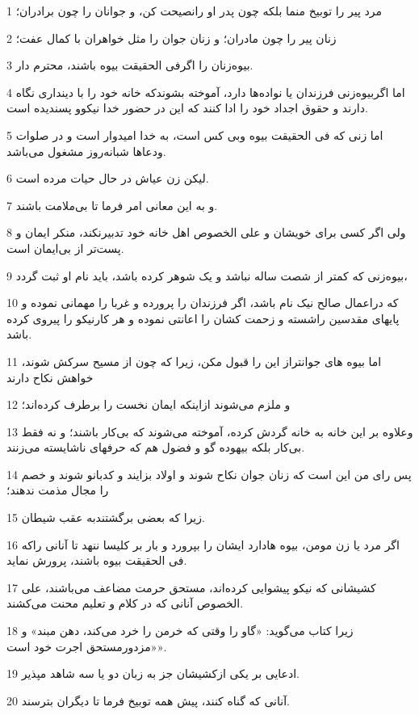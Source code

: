 \par 1 مرد پیر را توبیخ منما بلکه چون پدر او رانصیحت کن، و جوانان را چون برادران؛
\par 2 زنان پیر را چون مادران؛ و زنان جوان را مثل خواهران با کمال عفت؛
\par 3 بیوه‌زنان را اگرفی الحقیقت بیوه باشند، محترم دار.
\par 4 اما اگربیوه‌زنی فرزندان یا نواده‌ها دارد، آموخته بشوندکه خانه خود را با دینداری نگاه دارند و حقوق اجداد خود را ادا کنند که این در حضور خدا نیکوو پسندیده است.
\par 5 اما زنی که فی الحقیقت بیوه وبی کس است، به خدا امیدوار است و در صلوات ودعاها شبانه‌روز مشغول می‌باشد.
\par 6 لیکن زن عیاش در حال حیات مرده است.
\par 7 و به این معانی امر فرما تا بی‌ملامت باشند.
\par 8 ولی اگر کسی برای خویشان و علی الخصوص اهل خانه خود تدبیرنکند، منکر ایمان و پست‌تر از بی‌ایمان است.
\par 9 بیوه‌زنی که کمتر از شصت ساله نباشد و یک شوهر کرده باشد، باید نام او ثبت گردد،
\par 10 که دراعمال صالح نیک نام باشد، اگر فرزندان را پرورده و غربا را مهمانی نموده و پایهای مقدسین راشسته و زحمت کشان را اعانتی نموده و هر کارنیکو را پیروی کرده باشد.
\par 11 اما بیوه های جوانتراز این را قبول مکن، زیرا که چون از مسیح سرکش شوند، خواهش نکاح دارند
\par 12 و ملزم می‌شوند ازاینکه ایمان نخست را برطرف کرده‌اند؛
\par 13 وعلاوه بر این خانه به خانه گردش کرده، آموخته می‌شوند که بی‌کار باشند؛ و نه فقط بی‌کار بلکه بیهوده گو و فضول هم که حرفهای ناشایسته می‌زنند.
\par 14 پس رای من این است که زنان جوان نکاح شوند و اولاد بزایند و کدبانو شوند و خصم را مجال مذمت ندهند؛
\par 15 زیرا که بعضی برگشتندبه عقب شیطان.
\par 16 اگر مرد یا زن مومن، بیوه هادارد ایشان را بپرورد و بار بر کلیسا ننهد تا آنانی راکه فی الحقیقت بیوه باشند، پرورش نماید.
\par 17 کشیشانی که نیکو پیشوایی کرده‌اند، مستحق حرمت مضاعف می‌باشند، علی الخصوص آنانی که در کلام و تعلیم محنت می‌کشند.
\par 18 زیرا کتاب می‌گوید: «گاو را وقتی که خرمن را خرد می‌کند، دهن مبند» و «مزدورمستحق اجرت خود است».
\par 19 ادعایی بر یکی ازکشیشان جز به زبان دو یا سه شاهد مپذیر.
\par 20 آنانی که گناه کنند، پیش همه توبیخ فرما تا دیگران بترسند.
